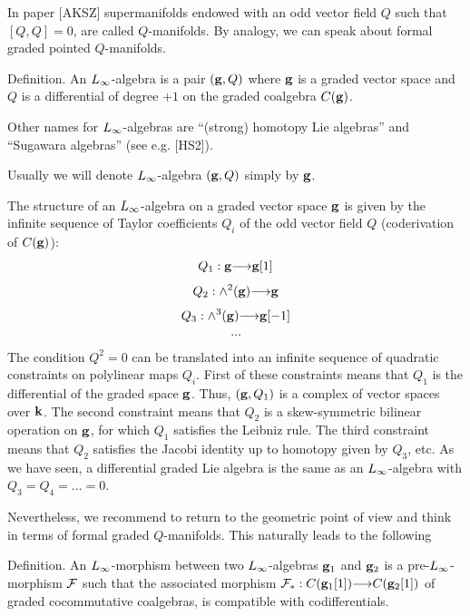   
       
      In paper [AKSZ] supermanifolds endowed with  an odd
       vector field $Q$ such that $[Q,Q]=0$, are called $Q$-manifolds.
        By analogy, we can speak about 
       formal graded pointed 
    $Q$-manifolds. 
       
   
   \proclaim Definition. An ${L_{\infty}}$-algebra is a  pair $({\bf g},Q)$ where
    ${\bf g}$ is a graded vector space  
   and 
   $Q$ is a differential 
    of degree $+1$ on the graded coalgebra $C({\bf g})$. \par
    
    Other names for ${L_{\infty}}$-algebras are ``(strong) homotopy Lie algebras''
     and ``Sugawara algebras'' (see e.g. [HS2]).
    
    Usually we will denote  ${L_{\infty}}$-algebra $({\bf g},Q)$
    simply by ${\bf g}$.
    
   
    
    
    
    The structure of an ${L_{\infty}}$-algebra on a graded vector space ${\bf g}$
    is given by the infinite sequence
    of Taylor coefficients $Q_i$ of the odd vector field $Q$ 
    (coderivation of $C({\bf g})$):
     $$Q_1: {\bf g}{\longrightarrow} {\bf g}[1]$$
     $$Q_2: \wedge^2({\bf g}){\longrightarrow} {\bf g}$$
     $$Q_3:\wedge^3({\bf g}){\longrightarrow} {\bf g}[-1]$$
      $$\dots$$
      
      The condition $Q^2=0$ can be translated into an infinite 
      sequence of quadratic constraints on polylinear 
      maps $Q_i$. First of these constraints means  that $Q_1$ 
      is the differential of the graded space ${\bf g}$. Thus, $({\bf g}, Q_1)$
      is a complex of vector spaces over ${\bf k}$.
       The 
       second constraint means that $Q_2$ is a skew-symmetric 
       bilinear operation on ${\bf g}$, for which 
        $Q_1$ satisfies the Leibniz rule. The third constraint means 
        that $Q_2$ satisfies the Jacobi identity
         up to homotopy given by $Q_3$, etc. 
          As we have seen, a differential graded Lie algebra is 
          the same as an ${L_{\infty}}$-algebra with 
           $Q_3=Q_4=\dots=0$.
           
            Nevertheless, we recommend to return to the geometric 
            point of view and 
         think in terms of formal graded
          $Q$-manifolds. This naturally 
         leads to the following
     
       
\proclaim Definition.  An ${L_{\infty}}$-morphism between two ${L_{\infty}}$-algebras ${\bf g}_1$ and 
${\bf g}_2$ 
is a pre-${L_{\infty}}$-morphism ${\cal F}$ such that the associated morphism 
 ${\cal F}_*
 :C({\bf g}_1[1]){\longrightarrow} C({\bf g}_2[1])$
 of graded cocommutative coalgebras, is compatible with codifferentials. 
 \par
 
